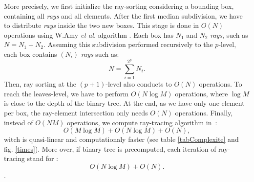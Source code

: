 \documentclass[AMA,STIX1COL]{WileyNJD-v2}
\begin{document}
More precisely, we first initialize the ray-sorting considering a bounding box, containing all \textit{rays} and all elements. After the first median subdivision, we have to distribute \textit{rays} inside the two new boxes. This stage is done in $O(N)$ operations using W.Amy \textit{et al.} algorithm \cite{AABB}. Each box has $N_1$ and $N_2$ \textit{rays}, such as $N = N_1 + N_2$. Assuming this subdivision performed recursively to the $p$-level, each box contains $(N_i)$ \textit{rays} such as: 
\begin{equation}
N = \sum_{i=1}^{2^p} N_i.
\end{equation}  
Then, ray sorting at the $(p+1)$-level also conducts to $O(N)$ operations. To reach the leaves-level, we have to perform $O(N \log M)$ operations, where $\log M$ is close to the depth of the binary tree. At the end, as we have only one element per box, the ray-element intersection only needs $O(N)$ operations. Finally, instead of $O(N M)$ operations, we compute ray-tracing algorithm in~: 
\begin{equation}
O(M\log M) + O(N \log M) + O(N),
\end{equation}  
witch is quasi-linear and computationaly faster (see table \ref{tabComplexite} and fig. \ref{times}).  More over, if binary tree is precomputed, each iteration of ray-tracing stand for :
\begin{equation}
O(N \log M) + O(N).
\end{equation}.  
 
\end{document}
